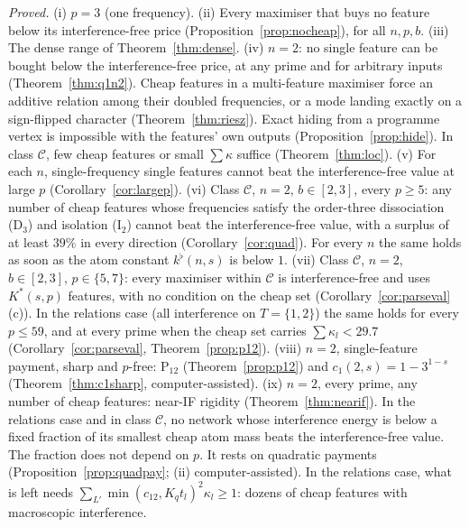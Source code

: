 \documentclass[11pt]{article}
\theoremstyle{definition}
\begin{document}
\emph{Proved.}  (i) $p=3$ (one frequency).  (ii) Every maximiser that buys no feature below its interference-free price
(Proposition~\ref{prop:nocheap}), for all $n,p,b$.  (iii) The dense range of Theorem~\ref{thm:dense}.  (iv) $n=2$: no single feature
can be bought below the interference-free price, at any prime and for arbitrary inputs (Theorem~\ref{thm:q1n2}).  Cheap features in a
multi-feature maximiser force an additive relation among their doubled frequencies, or a mode landing exactly on a
sign-flipped character (Theorem~\ref{thm:riesz}).  Exact hiding from a programme vertex is impossible with the features' own outputs
(Proposition~\ref{prop:hide}).  In class $\mathcal C$, few cheap features or small $\sum\kappa$ suffice (Theorem~\ref{thm:loc}).
(v) For each $n$, single-frequency single features cannot beat the interference-free value at large $p$ (Corollary~\ref{cor:largep}).
(vi) Class $\mathcal C$, $n=2$, $b\in[2,3]$, every $p\ge5$: any number of cheap features whose frequencies satisfy the order-three dissociation (D$_3$) and
isolation (I$_2$) cannot beat the interference-free value, with a surplus of at least $39\%$ in every direction (Corollary~\ref{cor:quad}).  For every $n$
the same holds as soon as the atom constant $k^\flat(n,s)$ is below $1$.
(vii) Class $\mathcal C$, $n=2$, $b\in[2,3]$, $p\in\{5,7\}$: every maximiser within $\mathcal C$ is interference-free and uses $K^*(s,p)$ features, with no
condition on the cheap set (Corollary~\ref{cor:parseval}(c)).  In the relations case (all interference on $T=\{1,2\}$) the same holds for every $p\le59$, and at every
prime when the cheap set carries $\sum\kappa_l<29.7$ (Corollary~\ref{cor:parseval}, Theorem~\ref{prop:p12}).
(viii) $n=2$, single-feature payment, sharp and $p$-free: P$_{12}$ (Theorem~\ref{prop:p12}) and $c_1(2,s)=1-3^{1-s}$ (Theorem~\ref{thm:c1sharp}, computer-assisted).
(ix) $n=2$, every prime, any number of cheap features: near-IF rigidity (Theorem~\ref{thm:nearif}).  In the relations case and in class $\mathcal C$, no network whose
interference energy is below a fixed fraction of its smallest cheap atom mass beats the interference-free value.  The fraction does not depend on $p$.  It rests on quadratic
payments (Proposition~\ref{prop:quadpay}; (ii) computer-assisted).  In the relations case, what is left needs $\sum_{L'}\min(c_{12},K_qt_l)^2\kappa_l\ge1$:
dozens of cheap features with macroscopic interference.
\end{document}
